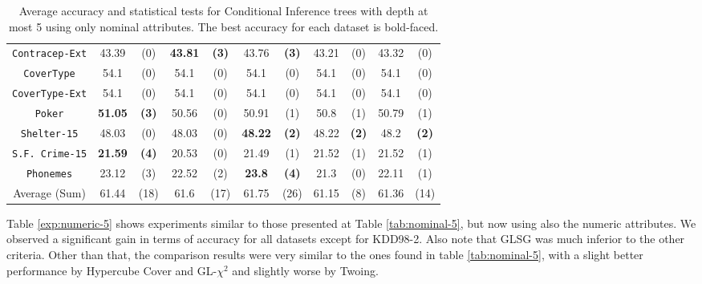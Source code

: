 \begin{table*}
\begin{tabular}{c|cc|cc|cc|cc|cc}
{\tt Contracep-Ext}&43.39       & (0)       & {\bf 43.81} & {\bf (3)} & 43.76       & {\bf (3)} & 43.21       & (0)       & 43.32       & (0)         \\
{\tt CoverType}    &54.1        & (0)       & 54.1        & (0)       & 54.1        & (0)       & 54.1        & (0)       & 54.1        & (0)         \\
{\tt CoverType-Ext}&54.1        & (0)       & 54.1        & (0)       & 54.1        & (0)       & 54.1        & (0)       & 54.1        & (0)         \\
{\tt Poker}        &{\bf 51.05} & {\bf (3)} & 50.56       & (0)       & 50.91       & (1)       & 50.8        & (1)       & 50.79       & (1)         \\  
{\tt Shelter-15}   & 48.03      & (0)       & 48.03       & (0)       & {\bf 48.22} & {\bf (2)} & 48.22       & {\bf (2)} & 48.2        & {\bf (2)}   \\   
{\tt S.F. Crime-15}&{\bf 21.59} & {\bf (4)} & 20.53       & (0)       & 21.49       & (1)       & 21.52       & (1)       & 21.52       & (1)         \\ 
{\tt Phonemes}     & 23.12      & (3)       & 22.52       & (2)       & {\bf 23.8 } & {\bf (4)} & 21.3        & (0)       & 22.11       & (1)         \\ 
\hline
Average (Sum)      & 61.44      & (18)      & 61.6        & (17)      & 61.75       & (26)      & 61.15       & (8)       & 61.36       & (14)   
       \end{tabular}
    \caption{Average accuracy and statistical tests  for  Conditional Inference trees 
with depth at most 5 using only nominal attributes. The best accuracy for each dataset is bold-faced.}
\label{tab:ctree-5}
\end{table*}


Table \ref{exp:numeric-5} shows experiments  similar to those presented at Table \ref{tab:nominal-5}, but now using also the numeric attributes. We observed a significant gain in terms of accuracy for all datasets except for KDD98-2. Also note that GLSG was much inferior to the other criteria. Other than that, the comparison results were very similar to the ones found in table \ref{tab:nominal-5}, with a slight better performance by Hypercube Cover and GL-$\chi^2$ and slightly worse by Twoing.


